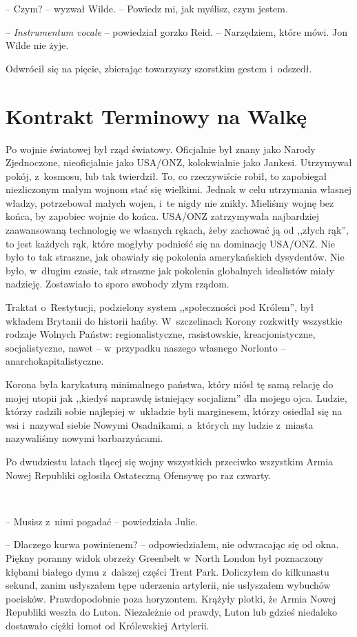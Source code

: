 \documentclass[oneside,polish,11pt,sfheadings]{mwbk}
\begin{document}
-- Czym? -- wyzwał Wilde. -- Powiedz mi, jak myślisz, czym jestem.

-- \emph{Instrumentum vocale} -- powiedział gorzko Reid. -- Narzędziem,
które mówi. Jon Wilde nie żyje.

Odwrócił się na pięcie, zbierając towarzyszy szorstkim gestem i~odszedł.

\chapter{Kontrakt Terminowy na Walkę}

Po wojnie światowej był rząd światowy. Oficjalnie był znany jako Narody
Zjednoczone, nieoficjalnie jako USA/ONZ, kolokwialnie jako Jankesi.
Utrzymywał pokój, z~kosmosu, lub tak twierdził. To, co rzeczywiście
robił, to zapobiegał niezliczonym małym wojnom stać się wielkimi. Jednak
w celu utrzymania własnej władzy, potrzebował małych wojen, i~te nigdy
nie znikły. Mieliśmy wojnę bez końca, by zapobiec wojnie do końca.
USA/ONZ zatrzymywała najbardziej zaawansowaną technologię we własnych
rękach, żeby zachować ją od ,,złych rąk'', to jest każdych rąk, które
mogłyby podnieść się na dominację USA/ONZ. Nie było to tak straszne, jak
obawiały się pokolenia amerykańskich dysydentów. Nie było, w~długim
czasie, tak straszne jak pokolenia globalnych idealistów miały nadzieję.
Zostawiało to sporo swobody złym rządom.

Traktat o~Restytucji, podzielony system ,,społeczności pod Królem'', był
wkładem Brytanii do historii hańby. W~szczelinach Korony rozkwitły
wszystkie rodzaje Wolnych Państw: regionalistyczne, rasistowskie,
kreacjonistyczne, socjalistyczne, nawet -- w~przypadku naszego własnego
Norlonto -- anarchokapitalistyczne.

Korona była karykaturą minimalnego państwa, który niósł tę samą relację
do mojej utopii jak ,,kiedyś naprawdę istniejący socjalizm'' dla mojego
ojca. Ludzie, którzy radzili sobie najlepiej w~układzie byli marginesem,
którzy osiedlał się na wsi i~nazywał siebie Nowymi Osadnikami, a~których
my ludzie z~miasta nazywaliśmy nowymi barbarzyńcami.

Po dwudziestu latach tlącej się wojny wszystkich przeciwko wszystkim
Armia Nowej Republiki ogłosiła Ostateczną Ofensywę po raz czwarty.

~

-- Musisz z~nimi pogadać -- powiedziała Julie.

-- Dlaczego kurwa powinienem? -- odpowiedziałem, nie odwracając się od
okna. Piękny poranny widok obrzeży Greenbelt w~North London był
poznaczony kłębami białego dymu z~dalszej części Trent Park. Doliczyłem
do kilkunastu sekund, zanim usłyszałem tępe uderzenia artylerii, nie
usłyszałem wybuchów pocisków. Prawdopodobnie poza horyzontem. Krążyły
plotki, że Armia Nowej Republiki weszła do Luton. Niezależnie od prawdy,
Luton lub gdzieś niedaleko dostawało ciężki łomot od Królewskiej
Artylerii.
\end{document}
